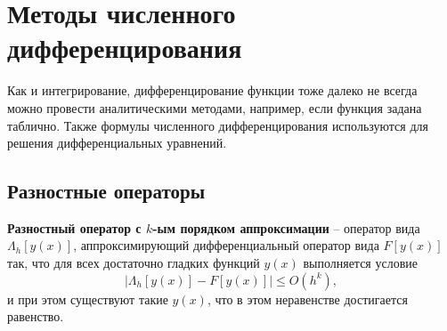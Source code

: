 \documentclass[../main.tex]{subfile}
\begin{document}
\section{Методы численного дифференцирования}
Как и интегрирование, дифференцирование функции тоже далеко не всегда можно
провести аналитическими методами, например, если функция задана таблично. Также
формулы численного дифференцирования используются для решения дифференциальных
уравнений.

\subsection{Разностные операторы}
\begin{define}
	\textbf{Разностный оператор с $k$-ым порядком аппроксимации} -- оператор
	вида $\Lambda_h[y(x)]$, аппроксимирующий дифференциальный оператор вида
	$F[y(x)]$ так, что для всех достаточно гладких функций $y(x)$
	выполняется условие
	\[\big|\Lambda_h[y(x)]-F[y(x)]\big|\le O(h^k),\]
	и при этом существуют такие $y(x)$, что в этом неравенстве достигается
	равенство.
\end{define}
\end{document}
